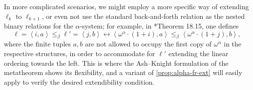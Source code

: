 \documentclass[11pt]{article}
\theoremstyle{plain}
\theoremstyle{definition}
\newcommand{\tuple}[1]{\left\langle #1 \right\rangle}
\begin{document}
In more complicated scenarios, we might employ a more specific way of extending $\ell_k$ to $\ell_{k + 1}$, or even not use the standard back-and-forth relation as the nested binary relations for the $\alpha$-system; for example, in \cite{ash-knight00-computable-structures}*{Theorem 18.15}, one defines
\[\ell = \tuple{i, a} \leq_\beta \ell' = \tuple{j, b} \longleftrightarrow \tuple{\omega^\alpha \cdot \left(1 + i\right), a} \leq_\beta \tuple{\omega^\alpha \cdot \left(1 + j\right), b},\]
where the finite tuples $a, b$ are not allowed to occupy the first copy of $\omega^\alpha$ in the respective structures, in order to accommodate for $\ell'$ extending the linear ordering towards the left. This is where the Ash--Knight formulation of the metatheorem shows its flexibility, and a variant of \autoref{prop:alpha-fr-ext} will easily apply to verify the desired extendibility condition.

\bibmain
\end{document}
